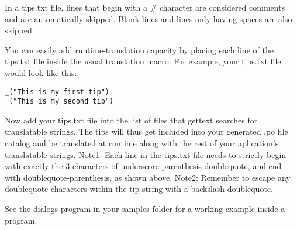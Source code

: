 In a tips.txt file, lines that begin with a \# character are considered comments 
and are automatically skipped. Blank lines and lines only having spaces are also 
skipped.

You can easily add runtime-translation capacity by placing each line of the 
tips.txt file inside the usual translation macro. For example, your tips.txt 
file would look like this:

\begin{verbatim}
_("This is my first tip")
_("This is my second tip")
\end{verbatim}

Now add your tips.txt file into the list of files that gettext searches 
for translatable strings. The tips will thus get included into your 
generated .po file catalog and be translated at runtime along with the rest of 
your aplication's translatable strings. 
Note1: Each line in the tips.txt file needs to strictly begin with exactly the 
3 characters of underscore-parenthesis-doublequote, and end with 
doublequote-parenthesis, as shown above. 
Note2: Remember to escape any doublequote characters within the tip string with
a backslash-doublequote.

See the dialogs program in your samples folder for a working example inside a 
program.


